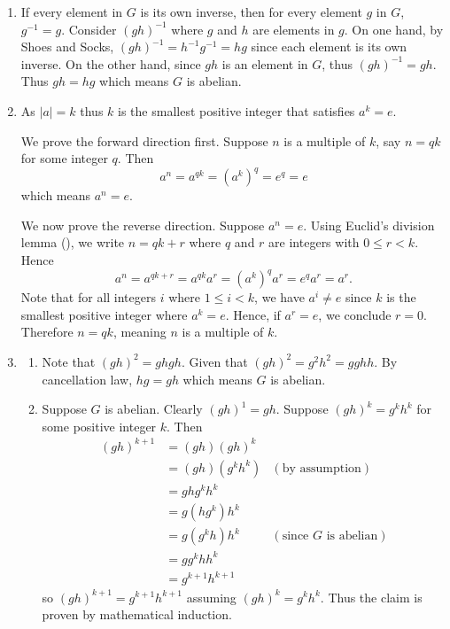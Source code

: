 \begin{enumerate}
    \item If every element in $G$ is its own inverse, then for every element $g$ in $G$, $g^{-1} = g$. Consider $(gh)^{-1}$ where $g$ and $h$ are elements in $g$. On one hand, by Shoes and Socks, $(gh)^{-1} = h^{-1}g^{-1} = hg$ since each element is its own inverse. On the other hand, since $gh$ is an element in $G$, thus $(gh)^{-1} = gh$. Thus $gh = hg$ which means $G$ is abelian.
    
    \item As $|a| = k$ thus $k$ is the smallest positive integer that satisfies $a^k = e$.
    
    We prove the forward direction first. Suppose $n$ is a multiple of $k$, say $n = qk$ for some integer $q$. Then
    \[
        a^n = a^{qk} = \left(a^k\right)^q = e^q = e    
    \]
    which means $a^n = e$.
    
    We now prove the reverse direction. Suppose $a^n = e$. Using Euclid's division lemma (), we write $n = qk + r$ where $q$ and $r$ are integers with $0 \leq r < k$. Hence
    \[
        a^n = a^{qk + r} = a^{qk}a^r = \left(a^k\right)^qa^r = e^qa^r = a^r.
    \]
    Note that for all integers $i$ where $1 \leq i < k$, we have $a^i \neq e$ since $k$ is the smallest positive integer where $a^k = e$. Hence, if $a^r = e$, we conclude $r = 0$. Therefore $n = qk$, meaning $n$ is a multiple of $k$.

    \item \begin{enumerate}[label=(\alph*)]
        \item Note that $(gh)^2 = ghgh$. Given that $(gh)^2 = g^2h^2 = gghh$. By cancellation law, $hg = gh$ which means $G$ is abelian.
        \item Suppose $G$ is abelian. Clearly $(gh)^1 = gh$. Suppose $(gh)^{k} = g^kh^k$ for some positive integer $k$. Then
        \begin{align*}
            (gh)^{k+1} &= (gh)(gh)^k\\
            &= (gh)(g^kh^k) & (\text{by assumption})\\
            &= ghg^kh^k\\
            &= g(hg^k)h^k\\
            &= g(g^kh)h^k & (\text{since } G \text{ is abelian})\\
            &= gg^khh^k\\
            &= g^{k+1}h^{k+1}
        \end{align*}
        so $(gh)^{k+1} = g^{k+1}h^{k+1}$ assuming $(gh)^k = g^kh^k$. Thus the claim is proven by mathematical induction.
    \end{enumerate}


\end{enumerate}
